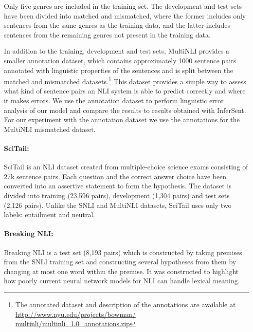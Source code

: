 \documentclass{nle}
\begin{document}
Only five genres are included in the training set. The development and test sets have been divided into matched and mismatched, where the former includes only sentences from the same genres as the training data, and the latter includes sentences from the remaining genres not present in the training data.

In addition to the training, development and test sets, MultiNLI provides a smaller annotation dataset, which contains approximately 1000 sentence pairs annotated with linguistic properties of the sentences and is split between the matched and mismatched datasets.\footnote{The annotated dataset and description of the annotations are available at \url{http://www.nyu.edu/projects/bowman/
multinli/multinli_1.0_annotations.zip}} This dataset provides a simple way to assess what kind of sentence pairs an NLI system is able to predict correctly and where it makes errors. We use the annotation dataset to perform linguistic error analysis of our model and compare the results to results obtained with InferSent. For our experiment with the annotation dataset we use the annotations for the MultiNLI mismatched dataset.

\paragraph{SciTail:}
SciTail \citep{scitail} is an NLI dataset created from multiple-choice science exams consisting of 27k sentence pairs. Each question and the correct answer choice have been converted into an assertive statement to form the hypothesis. The dataset is divided into training (23,596 pairs), development (1,304 pairs) and test sets (2,126 pairs). Unlike the SNLI and MultiNLI datasets, SciTail uses only two labels: entailment and neutral.

\paragraph{Breaking NLI:}
Breaking NLI \citep{breakingNLI} is a test set (8,193 pairs) which is constructed by taking premises from the SNLI training set and constructing several hypotheses from them by changing at most one word within the premise. It was constructed to highlight how poorly current neural network models for NLI can handle lexical meaning.
\end{document}
